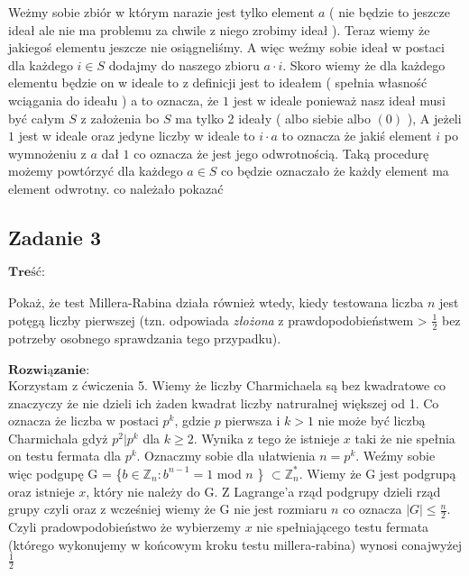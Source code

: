 Weżmy sobie zbiór w którym narazie jest tylko element $a$ ( nie będzie to jeszcze ideał ale nie ma problemu za chwile z niego zrobimy ideał ). Teraz wiemy że jakiegoś elementu jeszcze nie osiągneliśmy. A więc weźmy sobie ideał w postaci dla każdego $i \in S$ dodajmy do naszego zbioru $a\cdot i$. Skoro wiemy że dla każdego elementu będzie on w ideale to z definicji jest to ideałem ( spełnia własność wciągania do ideału ) a to oznacza, że $1$ jest w ideale ponieważ nasz ideał musi być całym $S$ z założenia bo $S$ ma tylko 2 ideały ( albo siebie albo $(0)$ ), A jeżeli $1$ jest w ideale oraz jedyne liczby w ideale to $i\cdot a$ to oznacza że jakiś element $i$ po wymnożeniu z $a$ dał $1$ co oznacza że jest jego odwrotnością. Taką procedurę możemy powtórzyć dla każdego $a \in S$ co będzie oznaczało że każdy element ma element odwrotny. co należało pokazać

\subsection{Zadanie 3}
$\textbf{Treść:}$  \\ \\
Pokaż, że test Millera-Rabina działa również wtedy, kiedy testowana liczba
$n$ jest potęgą liczby pierwszej (tzn. odpowiada \textit{złożona} z prawdopodobieństwem > $\frac{1}{2}$
bez potrzeby osobnego sprawdzania tego przypadku).
\\
\\
$\textbf{Rozwiązanie:}$ \\
Korzystam z ćwiczenia 5. Wiemy że liczby Charmichaela są bez kwadratowe co znaczyczy że nie dzieli ich żaden kwadrat liczby natruralnej większej od 1. Co oznacza że liczba w postaci $p^k$, gdzie $p$ pierwsza i $k > 1$ nie może być liczbą Charmichala gdyż $p^2 | p^k$ dla $k \ge 2$. Wynika z tego że istnieje $x$ taki że nie spełnia on testu fermata dla $p^k$. Oznaczmy sobie dla ułatwienia $n = p^k$. Weźmy sobie więc podgupę G = \{$b \in  \mathbb{Z}_{n} : b^{n-1} = 1$ mod $n$ \} $\subset \mathbb{Z}_{n}^{*}$. Wiemy że G jest podgrupą oraz istnieje $x$, który nie należy do G. Z Lagrange'a rząd podgrupy dzieli rząd grupy czyli oraz z wcześniej wiemy że G nie jest rozmiaru $n$ co oznacza $|G| \leq \frac{n}{2}$. Czyli pradowpodobieństwo że wybierzemy $x$ nie spełniającego testu fermata (którego wykonujemy w końcowym kroku testu millera-rabina) wynosi conajwyżej $\frac{1}{2}$



